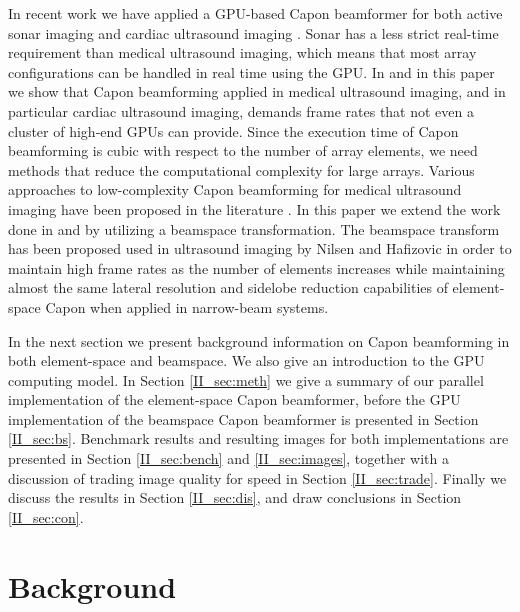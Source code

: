 In recent work we have applied a GPU-based Capon beamformer for both active sonar imaging \cite{Buskenes, Buskenes2013} and cardiac ultrasound imaging \cite{Asen2012}. Sonar has a less strict real-time requirement than medical ultrasound imaging, which means that most array configurations can be handled in real time using the GPU. In \cite{Asen2012} and in this paper we show that Capon beamforming applied in medical ultrasound imaging, and in particular cardiac ultrasound imaging, demands frame rates that not even a cluster of high-end GPUs can provide. Since the execution time of Capon beamforming is cubic with respect to the number of array elements, we need methods that reduce the computational complexity for large arrays. Various approaches to low-complexity Capon beamforming for medical ultrasound imaging have been proposed in the literature \cite{Synnevag2011, Asl2012, Jensen2012, Kim}. In this paper we extend the work done in \cite{Asen2012} and \cite{Buskenes2013} by utilizing a beamspace transformation. The beamspace transform has been proposed used in ultrasound imaging by Nilsen and Hafizovic \cite{Nilsen2009} in order to maintain high frame rates as the number of elements increases while maintaining almost the same lateral resolution and sidelobe reduction capabilities of element-space Capon when applied in narrow-beam systems.

In the next section we present background information on Capon beamforming in both element-space and beamspace. We also give an introduction to the GPU computing model. In Section \ref{II_sec:meth} we give a summary of our parallel implementation of the element-space Capon beamformer, before the GPU implementation of the beamspace Capon beamformer is presented in Section \ref{II_sec:bs}. Benchmark results and resulting images for both implementations are presented in Section \ref{II_sec:bench} and \ref{II_sec:images}, together with a discussion of trading image quality for speed in Section \ref{II_sec:trade}. Finally we discuss the results in Section \ref{II_sec:dis}, and draw conclusions in Section \ref{II_sec:con}. 

\section{Background}\label{II_background}

